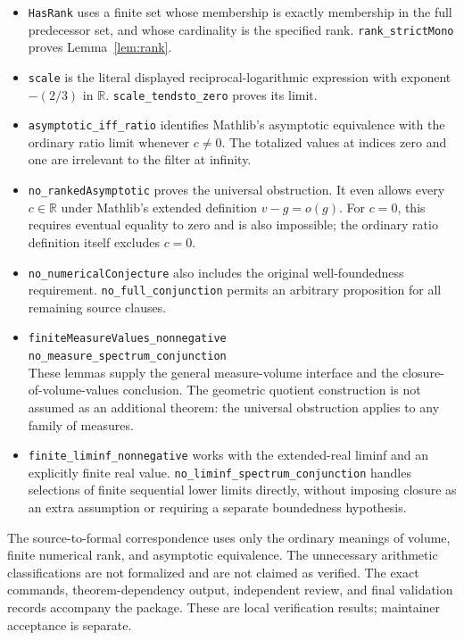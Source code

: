 \documentclass[11pt]{article}
\newcommand{\R}{\mathbb R}
\begin{document}
\begin{itemize}
\item \texttt{HasRank} uses a finite set whose membership is exactly
membership in the full predecessor set, and whose cardinality is the
specified rank. \texttt{rank\_strictMono} proves Lemma~\ref{lem:rank}.
\item \texttt{scale} is the literal displayed reciprocal-logarithmic
expression with exponent $-(2/3)$ in $\R$.
\texttt{scale\_tendsto\_zero} proves its limit.
\item \texttt{asymptotic\_iff\_ratio} identifies Mathlib's asymptotic
equivalence with the ordinary ratio limit whenever $c\ne0$.
The totalized values at indices zero and one are irrelevant to the
filter at infinity.
\item \texttt{no\_rankedAsymptotic} proves the universal obstruction.
It even allows every $c\in\R$ under Mathlib's extended definition
$v-g=o(g)$. For $c=0$, this requires eventual equality to zero and is
also impossible; the ordinary ratio definition itself excludes $c=0$.
\item \texttt{no\_numericalConjecture} also includes the original
well-foundedness requirement. \texttt{no\_full\_conjunction} permits
an arbitrary proposition for all remaining source clauses.
\item \texttt{finiteMeasureValues\_nonnegative}\\
\texttt{no\_measure\_spectrum\_conjunction}\\
These lemmas supply the general
measure-volume interface and the closure-of-volume-values conclusion.
The geometric quotient construction is not assumed as an additional
theorem: the universal obstruction applies to any family of measures.
\item \texttt{finite\_liminf\_nonnegative} works with the
extended-real liminf and an explicitly finite real value.
\texttt{no\_liminf\_spectrum\_conjunction} handles selections of finite
sequential lower limits directly, without imposing closure as an extra
assumption or requiring a separate boundedness hypothesis.
\end{itemize}

The source-to-formal correspondence uses only the ordinary meanings of
volume, finite numerical rank, and asymptotic equivalence. The
unnecessary arithmetic classifications are not formalized and are not
claimed as verified. The exact commands, theorem-dependency output,
independent review, and final validation records accompany the package.
These are local verification results; maintainer acceptance is separate.
\end{document}

